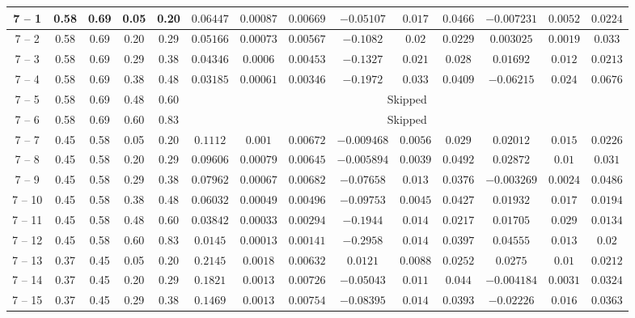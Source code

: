 \begin{longtable}{|*{14}{c|}}
\hline
7 -- 1 & 0.58 & 0.69 & 0.05 & 0.20 & $0.06447$ & $0.00087$ & $0.00669$ & $-0.05107$ & $0.017$ & $0.0466$ & $-0.007231$ & $0.0052$ & $0.0224$ \\
\hline
7 -- 2 & 0.58 & 0.69 & 0.20 & 0.29 & $0.05166$ & $0.00073$ & $0.00567$ & $-0.1082$ & $0.02$ & $0.0229$ & $0.003025$ & $0.0019$ & $0.033$ \\
\hline
7 -- 3 & 0.58 & 0.69 & 0.29 & 0.38 & $0.04346$ & $0.0006$ & $0.00453$ & $-0.1327$ & $0.021$ & $0.028$ & $0.01692$ & $0.012$ & $0.0213$ \\
\hline
7 -- 4 & 0.58 & 0.69 & 0.38 & 0.48 & $0.03185$ & $0.00061$ & $0.00346$ & $-0.1972$ & $0.033$ & $0.0409$ & $-0.06215$ & $0.024$ & $0.0676$ \\
\hline
7 -- 5 & 0.58 & 0.69 & 0.48 & 0.60 & \multicolumn{9}{c|}{Skipped} \\
\hline
7 -- 6 & 0.58 & 0.69 & 0.60 & 0.83 & \multicolumn{9}{c|}{Skipped} \\
\hline
7 -- 7 & 0.45 & 0.58 & 0.05 & 0.20 & $0.1112$ & $0.001$ & $0.00672$ & $-0.009468$ & $0.0056$ & $0.029$ & $0.02012$ & $0.015$ & $0.0226$ \\
\hline
7 -- 8 & 0.45 & 0.58 & 0.20 & 0.29 & $0.09606$ & $0.00079$ & $0.00645$ & $-0.005894$ & $0.0039$ & $0.0492$ & $0.02872$ & $0.01$ & $0.031$ \\
\hline
7 -- 9 & 0.45 & 0.58 & 0.29 & 0.38 & $0.07962$ & $0.00067$ & $0.00682$ & $-0.07658$ & $0.013$ & $0.0376$ & $-0.003269$ & $0.0024$ & $0.0486$ \\
\hline
7 -- 10 & 0.45 & 0.58 & 0.38 & 0.48 & $0.06032$ & $0.00049$ & $0.00496$ & $-0.09753$ & $0.0045$ & $0.0427$ & $0.01932$ & $0.017$ & $0.0194$ \\
\hline
7 -- 11 & 0.45 & 0.58 & 0.48 & 0.60 & $0.03842$ & $0.00033$ & $0.00294$ & $-0.1944$ & $0.014$ & $0.0217$ & $0.01705$ & $0.029$ & $0.0134$ \\
\hline
7 -- 12 & 0.45 & 0.58 & 0.60 & 0.83 & $0.0145$ & $0.00013$ & $0.00141$ & $-0.2958$ & $0.014$ & $0.0397$ & $0.04555$ & $0.013$ & $0.02$ \\
\hline
7 -- 13 & 0.37 & 0.45 & 0.05 & 0.20 & $0.2145$ & $0.0018$ & $0.00632$ & $0.0121$ & $0.0088$ & $0.0252$ & $0.0275$ & $0.01$ & $0.0212$ \\
\hline
7 -- 14 & 0.37 & 0.45 & 0.20 & 0.29 & $0.1821$ & $0.0013$ & $0.00726$ & $-0.05043$ & $0.011$ & $0.044$ & $-0.004184$ & $0.0031$ & $0.0324$ \\
\hline
7 -- 15 & 0.37 & 0.45 & 0.29 & 0.38 & $0.1469$ & $0.0013$ & $0.00754$ & $-0.08395$ & $0.014$ & $0.0393$ & $-0.02226$ & $0.016$ & $0.0363$ \\

\end{longtable}
